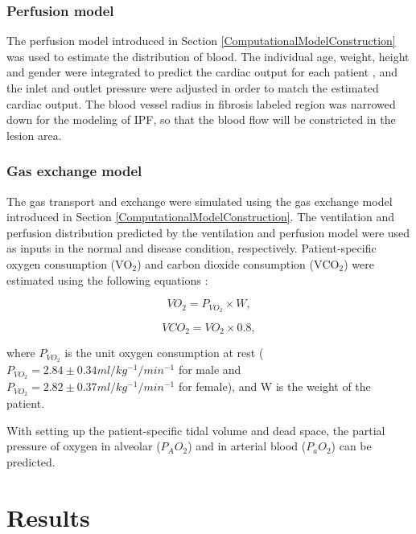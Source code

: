 \subsubsection{Perfusion model}
The perfusion model introduced in Section \ref{ComputationalModelConstruction} was used to estimate the distribution of blood. The individual age, weight, height and gender were integrated to predict the cardiac output for each patient \citep{brandfonbrener1955changes, miyamura1973maximum, stelfox2006hemodynamic}, and the inlet and outlet pressure were adjusted in order to match the estimated cardiac output. The blood vessel radius in fibrosis labeled region was narrowed down for the modeling of IPF, so that the blood flow will be constricted in the lesion area.

\subsubsection{Gas exchange model}
The gas transport and exchange were simulated using the gas exchange model introduced in Section \ref{ComputationalModelConstruction}. The ventilation and perfusion distribution predicted by the ventilation and perfusion model were used as inputs in the normal and disease condition, respectively. Patient-specific oxygen consumption ($\mathrm{VO_2}$) and carbon dioxide consumption ($\mathrm{VCO_2}$) were estimated using the following equations \citep{kwan2004standard, coelho2013estimation}:

\begin{equation} 
 \label{eq:O2ConsumptionEstimation}
 VO_2 = P_{VO_2} \times W,
\end{equation}

\begin{equation} 
 \label{eq:CO2ConsumptionEstimation}
 VCO_2 = VO_2 \times 0.8,
\end{equation}

\noindent where $P_{VO_2}$ is the unit oxygen consumption at rest ($P_{VO_2} = 2.84 \pm 0.34 ml/kg^{-1}/min^{-1}$ for male and $P_{VO_2} = 2.82 \pm 0.37 ml/kg^{-1}/min^{-1}$ for female), and W is the weight of the patient.

With setting up the patient-specific tidal volume and dead space, the partial pressure of oxygen in alveolar ($P_AO_2$) and in arterial blood ($P_aO_2$) can be predicted.
\newpage

\section{Results}
